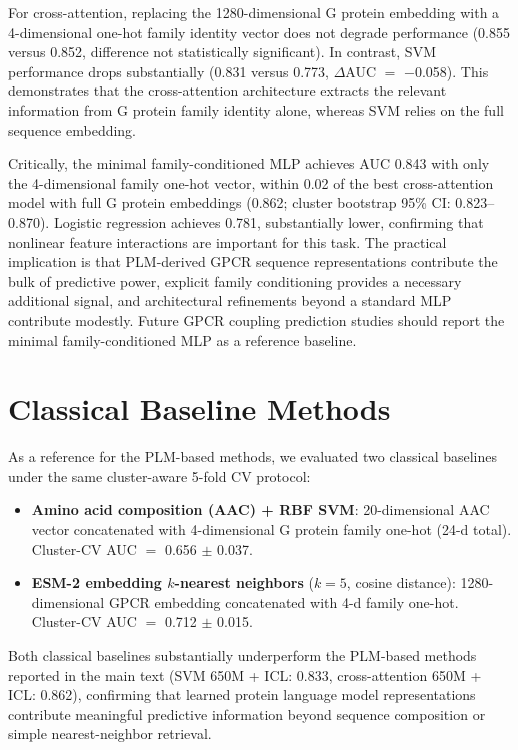 \documentclass[11pt,a4paper]{article}
\begin{document}
For cross-attention, replacing the 1280-dimensional G protein embedding with a 4-dimensional one-hot family identity vector does not degrade performance (0.855 versus 0.852, difference not statistically significant). In contrast, SVM performance drops substantially (0.831 versus 0.773, $\Delta$AUC $=$ $-$0.058). This demonstrates that the cross-attention architecture extracts the relevant information from G protein family identity alone, whereas SVM relies on the full sequence embedding.

Critically, the minimal family-conditioned MLP achieves AUC 0.843 with only the 4-dimensional family one-hot vector, within 0.02 of the best cross-attention model with full G protein embeddings (0.862; cluster bootstrap 95\% CI: 0.823--0.870). Logistic regression achieves 0.781, substantially lower, confirming that nonlinear feature interactions are important for this task. The practical implication is that PLM-derived GPCR sequence representations contribute the bulk of predictive power, explicit family conditioning provides a necessary additional signal, and architectural refinements beyond a standard MLP contribute modestly. Future GPCR coupling prediction studies should report the minimal family-conditioned MLP as a reference baseline.

\section{Classical Baseline Methods}

As a reference for the PLM-based methods, we evaluated two classical baselines under the same cluster-aware 5-fold CV protocol:

\begin{itemize}
  \item \textbf{Amino acid composition (AAC) + RBF SVM}: 20-dimensional AAC vector concatenated with 4-dimensional G protein family one-hot (24-d total). Cluster-CV AUC $=$ 0.656 $\pm$ 0.037.
  \item \textbf{ESM-2 embedding $k$-nearest neighbors} ($k=5$, cosine distance): 1280-dimensional GPCR embedding concatenated with 4-d family one-hot. Cluster-CV AUC $=$ 0.712 $\pm$ 0.015.
\end{itemize}

Both classical baselines substantially underperform the PLM-based methods reported in the main text (SVM 650M + ICL: 0.833, cross-attention 650M + ICL: 0.862), confirming that learned protein language model representations contribute meaningful predictive information beyond sequence composition or simple nearest-neighbor retrieval.
\end{document}
